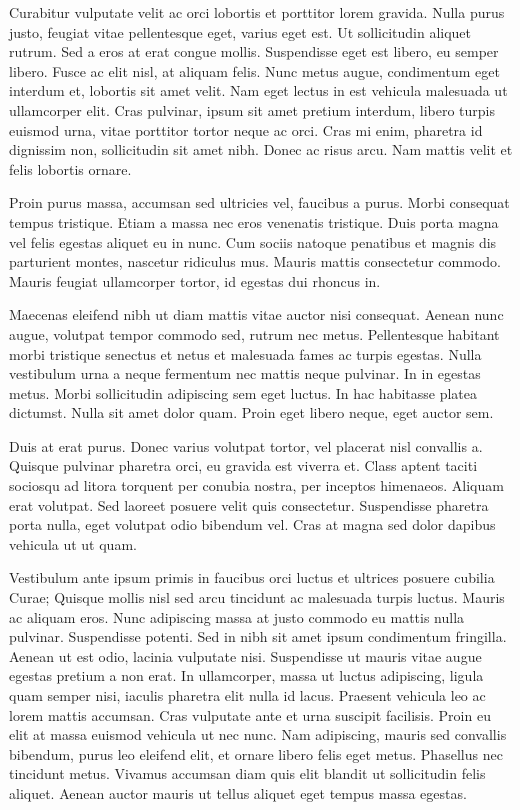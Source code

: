 \documentclass[a4paper]{article}
\begin{document}
Curabitur vulputate velit ac orci lobortis et porttitor lorem gravida. Nulla purus justo, feugiat vitae pellentesque eget, varius eget est. Ut sollicitudin aliquet rutrum. Sed a eros at erat congue mollis. Suspendisse eget est libero, eu semper libero. Fusce ac elit nisl, at aliquam felis. Nunc metus augue, condimentum eget interdum et, lobortis sit amet velit. Nam eget lectus in est vehicula malesuada ut ullamcorper elit. Cras pulvinar, ipsum sit amet pretium interdum, libero turpis euismod urna, vitae porttitor tortor neque ac orci. Cras mi enim, pharetra id dignissim non, sollicitudin sit amet nibh. Donec ac risus arcu. Nam mattis velit et felis lobortis ornare.

Proin purus massa, accumsan sed ultricies vel, faucibus a purus. Morbi consequat tempus tristique. Etiam a massa nec eros venenatis tristique. Duis porta magna vel felis egestas aliquet eu in nunc. Cum sociis natoque penatibus et magnis dis parturient montes, nascetur ridiculus mus. Mauris mattis consectetur commodo. Mauris feugiat ullamcorper tortor, id egestas dui rhoncus in.

Maecenas eleifend nibh ut diam mattis vitae auctor nisi consequat. Aenean nunc augue, volutpat tempor commodo sed, rutrum nec metus. Pellentesque habitant morbi tristique senectus et netus et malesuada fames ac turpis egestas. Nulla vestibulum urna a neque fermentum nec mattis neque pulvinar. In in egestas metus. Morbi sollicitudin adipiscing sem eget luctus. In hac habitasse platea dictumst. Nulla sit amet dolor quam. Proin eget libero neque, eget auctor sem.

Duis at erat purus. Donec varius volutpat tortor, vel placerat nisl convallis a. Quisque pulvinar pharetra orci, eu gravida est viverra et. Class aptent taciti sociosqu ad litora torquent per conubia nostra, per inceptos himenaeos. Aliquam erat volutpat. Sed laoreet posuere velit quis consectetur. Suspendisse pharetra porta nulla, eget volutpat odio bibendum vel. Cras at magna sed dolor dapibus vehicula ut ut quam.

Vestibulum ante ipsum primis in faucibus orci luctus et ultrices posuere cubilia Curae; Quisque mollis nisl sed arcu tincidunt ac malesuada turpis luctus. Mauris ac aliquam eros. Nunc adipiscing massa at justo commodo eu mattis nulla pulvinar. Suspendisse potenti. Sed in nibh sit amet ipsum condimentum fringilla. Aenean ut est odio, lacinia vulputate nisi. Suspendisse ut mauris vitae augue egestas pretium a non erat. In ullamcorper, massa ut luctus adipiscing, ligula quam semper nisi, iaculis pharetra elit nulla id lacus. Praesent vehicula leo ac lorem mattis accumsan. Cras vulputate ante et urna suscipit facilisis. Proin eu elit at massa euismod vehicula ut nec nunc. Nam adipiscing, mauris sed convallis bibendum, purus leo eleifend elit, et ornare libero felis eget metus. Phasellus nec tincidunt metus. Vivamus accumsan diam quis elit blandit ut sollicitudin felis aliquet. Aenean auctor mauris ut tellus aliquet eget tempus massa egestas.
\end{document}
